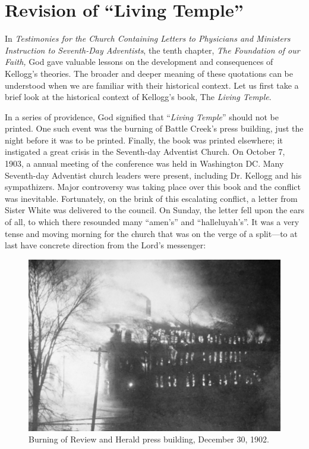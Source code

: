 \chapter{Revision of “Living Temple”}

In \textit{Testimonies for the Church Containing Letters to Physicians and Ministers Instruction to Seventh-Day Adventists}, the tenth chapter, \textit{The Foundation of our Faith,} God gave valuable lessons on the development and consequences of Kellogg's theories. The broader and deeper meaning of these quotations can be understood when we are familiar with their historical context. Let us first take a brief look at the historical context of Kellogg's book, The \textit{Living Temple}.

In a series of providence, God signified that “\textit{Living Temple}” should not be printed. One such event was the burning of Battle Creek's press building, just the night before it was to be printed. Finally, the book was printed elsewhere; it instigated a great crisis in the Seventh-day Adventist Church. On October 7, 1903, a annual meeting of the conference was held in Washington DC. Many Seventh-day Adventist church leaders were present, including Dr. Kellogg and his sympathizers. Major controversy was taking place over this book and the conflict was inevitable. Fortunately, on the brink of this escalating conflict, a letter from Sister White was delivered to the council. On Sunday, the letter fell upon the ears of all, to which there resounded many “amen's” and “halleluyah's”. It was a very tense and moving morning for the church that was on the verge of a split—to at last have concrete direction from the Lord's messenger:

\begin{figure}[h]
    \centering
    \includegraphics[width=1\linewidth]{images/review-and-herlad.jpg}
    \caption*{Burning of Review and Herald press building, December 30, 1902.}
    \label{fig:review-and-herald}
\end{figure}

